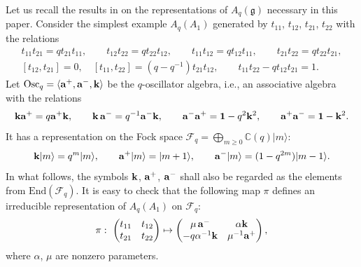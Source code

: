 \documentclass[11pt]{article}
\begin{document}
Let us recall the results in \cite{So2, VS}
on the representations of $A_q(\mathfrak{g})$
necessary in this paper.
Consider the simplest example $A_q(A_1)$ generated by
$t_{11}$, $t_{12}$, $t_{21}$, $t_{22}$
with the relations
\begin{gather*}
t_{11}t_{21} = qt_{21}t_{11},\qquad
t_{12}t_{22} = qt_{22}t_{12},\qquad
t_{11}t_{12} = qt_{12}t_{11},\qquad
t_{21}t_{22} = qt_{22}t_{21},\\
[t_{12},t_{21}]=0,\quad [t_{11},t_{22}]=(q-q^{-1})t_{21}t_{12},
\qquad t_{11}t_{22}-qt_{12}t_{21}=1.
\end{gather*}
Let $\mathrm{Osc}_q =
\langle  {\rm{\bf a}}^+, {\rm{\bf a}}^-, {\rm{\bf k}} \rangle$
be the $q$-oscillator algebra, i.e.,
an associative algebra with the relations
\begin{gather}\label{a:qoa}
{\rm{\bf k}}  {\rm{\bf a}}^+ = q {\rm{\bf a}}^+{\rm{\bf k}},\qquad
{\rm{\bf k}}\,{\rm{\bf a}}^- = q^{-1}{\rm{\bf a}}^-{\rm{\bf k}},\qquad
{\rm{\bf a}}^- {\rm{\bf a}}^+ = {\bf 1}-q^2{\rm{\bf k}}^2,\qquad
{\rm{\bf a}}^+{\rm{\bf a}}^- = {\bf 1}-{\rm{\bf k}}^2.
\end{gather}
It has a representation on
the Fock space
$\mathcal{F}_q = \bigoplus_{m\ge 0}{\mathbb C}(q)|m\rangle$:
\begin{gather}\label{a:akf}
{\rm{\bf k}}|m\rangle = q^m |m\rangle,\qquad
{\rm{\bf a}}^+|m\rangle = |m+1\rangle,\qquad
{\rm{\bf a}}^-|m\rangle = (1-q^{2m})|m-1\rangle.
\end{gather}
In what follows, the symbols
${\rm{\bf k}}$, ${\rm{\bf a}}^+$, ${\rm{\bf a}}^-$ shall
also be regarded as the elements from $\mathrm{End}(\mathcal{F}_q)$.
It is easy to check that the following map $\pi$
def\/ines an irreducible representation of
$A_q(A_1)$ on $\mathcal{F}_q$:
\begin{gather}\label{a:pisl2}
\pi:  \ \begin{pmatrix}
t_{11} & t_{12}\\
t_{21} & t_{22}
\end{pmatrix} \mapsto
\begin{pmatrix}
\mu\,{\rm {\bf a}}^- &  \alpha {\rm {\bf k}}\\
-q\alpha^{-1}{\rm {\bf k}} & \mu^{-1}{\rm {\bf a}}^+
\end{pmatrix},
\end{gather}
where $\alpha$, $\mu$ are nonzero parameters.
\end{document}
